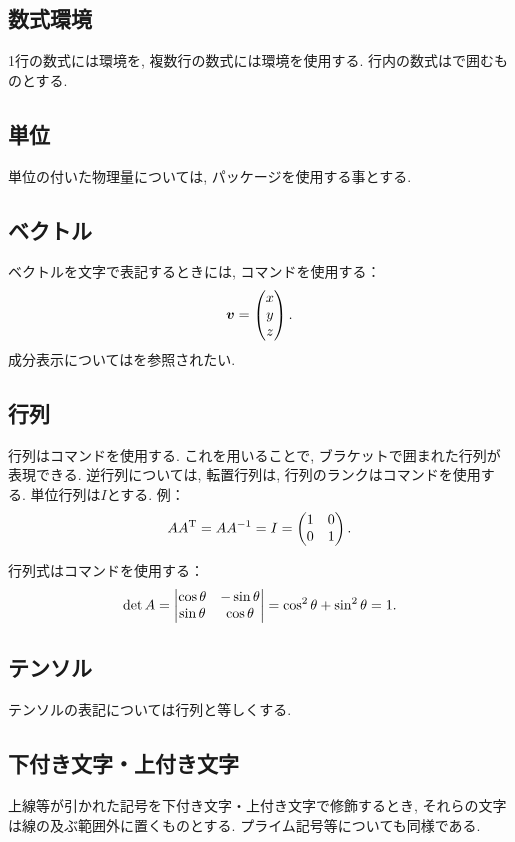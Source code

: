 \documentclass[uplatex,a4j,twocolumn]{jsarticle}
\begin{document}
	\subsection{数式環境}
		1行の数式には環境を, 複数行の数式には環境を使用する. 行内の数式は\code{\$}で囲むものとする.
	\subsection{単位}
		単位の付いた物理量については, パッケージを使用する事とする.
	\subsection{ベクトル}
		ベクトルを文字で表記するときには, コマンドを使用する：
		\begin{equation}
			\bm{v} = \begin{pmatrix} x \\ y \\ z \end{pmatrix}.
		\end{equation}
		成分表示についてはを参照されたい.
	\subsection{行列}
		行列はコマンドを使用する. これを用いることで, ブラケットで囲まれた行列が表現できる. 逆行列については, 転置行列は, 行列のランクはコマンドを使用する. 単位行列は$I$とする. 例：
		\begin{equation}
			A A^{\mathrm{T}} = A A^{-1} = I = \begin{pmatrix} 1 & 0 \\ 0 & 1 \end{pmatrix}.
		\end{equation}
		
		行列式はコマンドを使用する：
		\begin{equation}
			\det{A} = \begin{vmatrix} \cos{\theta} & -\sin{\theta} \\ \sin{\theta} & \cos{\theta} \end{vmatrix} = \cos^2{\theta} + \sin^2{\theta} = 1.
		\end{equation}
	\subsection{テンソル}
		テンソルの表記については行列と等しくする.
	\subsection{下付き文字・上付き文字}
		上線等が引かれた記号を下付き文字・上付き文字で修飾するとき, それらの文字は線の及ぶ範囲外に置くものとする. プライム記号等についても同様である. 

\balance
\end{document}
